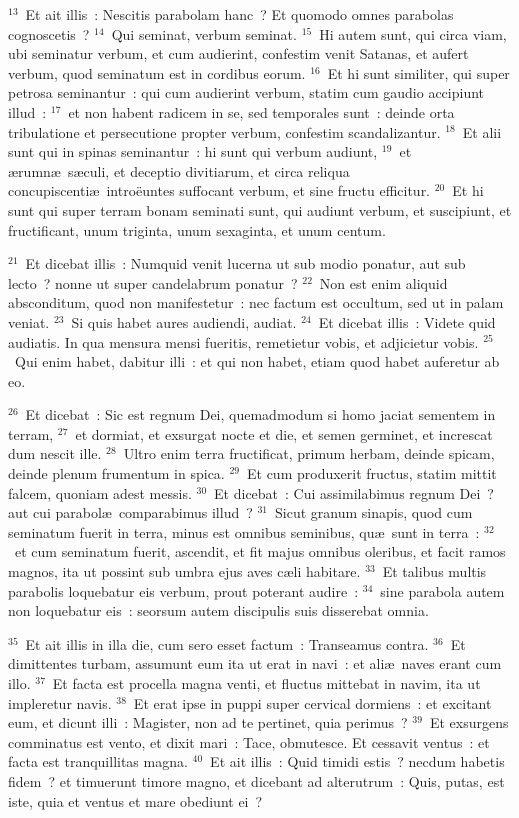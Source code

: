 ${}^{13}$~Et ait illis~: Nescitis parabolam hanc~? Et quomodo omnes parabolas cognoscetis~?
${}^{14}$~Qui seminat, verbum seminat.
${}^{15}$~Hi autem sunt, qui circa viam, ubi seminatur verbum, et cum audierint, confestim venit Satanas, et aufert verbum, quod seminatum est in cordibus eorum.
${}^{16}$~Et hi sunt similiter, qui super petrosa seminantur~: qui cum audierint verbum, statim cum gaudio accipiunt illud~:
${}^{17}$~et non habent radicem in se, sed temporales sunt~: deinde orta tribulatione et persecutione propter verbum, confestim scandalizantur.
${}^{18}$~Et alii sunt qui in spinas seminantur~: hi sunt qui verbum audiunt,
${}^{19}$~et \ae rumn\ae\ s\ae culi, et deceptio divitiarum, et circa reliqua concupiscenti\ae\ intro\"euntes suffocant verbum, et sine fructu efficitur.
${}^{20}$~Et hi sunt qui super terram bonam seminati sunt, qui audiunt verbum, et suscipiunt, et fructificant, unum triginta, unum sexaginta, et unum centum.


${}^{21}$~Et dicebat illis~: Numquid venit lucerna ut sub modio ponatur, aut sub lecto~? nonne ut super candelabrum ponatur~?
${}^{22}$~Non est enim aliquid absconditum, quod non manifestetur~: nec factum est occultum, sed ut in palam veniat.
${}^{23}$~Si quis habet aures audiendi, audiat.
${}^{24}$~Et dicebat illis~: Videte quid audiatis. In qua mensura mensi fueritis, remetietur vobis, et adjicietur vobis.
${}^{25}$~Qui enim habet, dabitur illi~: et qui non habet, etiam quod habet auferetur ab eo.


${}^{26}$~Et dicebat~: Sic est regnum Dei, quemadmodum si homo jaciat sementem in terram,
${}^{27}$~et dormiat, et exsurgat nocte et die, et semen germinet, et increscat dum nescit ille.
${}^{28}$~Ultro enim terra fructificat, primum herbam, deinde spicam, deinde plenum frumentum in spica.
${}^{29}$~Et cum produxerit fructus, statim mittit falcem, quoniam adest messis.
${}^{30}$~Et dicebat~: Cui assimilabimus regnum Dei~? aut cui parabol\ae\ comparabimus illud~?
${}^{31}$~Sicut granum sinapis, quod cum seminatum fuerit in terra, minus est omnibus seminibus, qu\ae\ sunt in terra~:
${}^{32}$~et cum seminatum fuerit, ascendit, et fit majus omnibus oleribus, et facit ramos magnos, ita ut possint sub umbra ejus aves c\ae li habitare.
${}^{33}$~Et talibus multis parabolis loquebatur eis verbum, prout poterant audire~:
${}^{34}$~sine parabola autem non loquebatur eis~: seorsum autem discipulis suis disserebat omnia.


${}^{35}$~Et ait illis in illa die, cum sero esset factum~: Transeamus contra.
${}^{36}$~Et dimittentes turbam, assumunt eum ita ut erat in navi~: et ali\ae\ naves erant cum illo.
${}^{37}$~Et facta est procella magna venti, et fluctus mittebat in navim, ita ut impleretur navis.
${}^{38}$~Et erat ipse in puppi super cervical dormiens~: et excitant eum, et dicunt illi~: Magister, non ad te pertinet, quia perimus~?
${}^{39}$~Et exsurgens comminatus est vento, et dixit mari~: Tace, obmutesce. Et cessavit ventus~: et facta est tranquillitas magna.
${}^{40}$~Et ait illis~: Quid timidi estis~? necdum habetis fidem~? et timuerunt timore magno, et dicebant ad alterutrum~: Quis, putas, est iste, quia et ventus et mare obediunt ei~?

